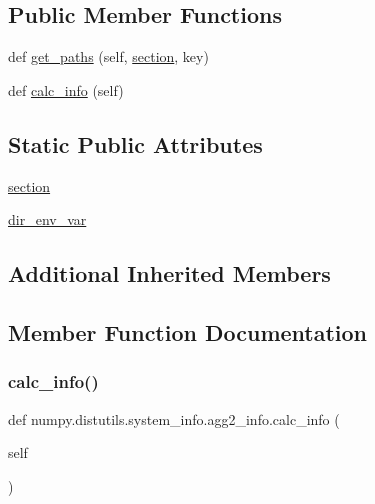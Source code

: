 \subsection*{Public Member Functions}
\begin{DoxyCompactItemize}
\item 
def \hyperlink{classnumpy_1_1distutils_1_1system__info_1_1agg2__info_aa384beee61c4af70b173aef9924310e1}{get\+\_\+paths} (self, \hyperlink{classnumpy_1_1distutils_1_1system__info_1_1agg2__info_a9e8ae6b2cc434264356af9c4a2d97e0a}{section}, key)
\item 
def \hyperlink{classnumpy_1_1distutils_1_1system__info_1_1agg2__info_aec2bec1c4276929408e5fb1f821d62ae}{calc\+\_\+info} (self)
\end{DoxyCompactItemize}
\subsection*{Static Public Attributes}
\begin{DoxyCompactItemize}
\item 
\hyperlink{classnumpy_1_1distutils_1_1system__info_1_1agg2__info_a9e8ae6b2cc434264356af9c4a2d97e0a}{section}
\item 
\hyperlink{classnumpy_1_1distutils_1_1system__info_1_1agg2__info_ab2739736e545a1f6f2c01427e8a7b90e}{dir\+\_\+env\+\_\+var}
\end{DoxyCompactItemize}
\subsection*{Additional Inherited Members}


\subsection{Member Function Documentation}
\mbox{\label{classnumpy_1_1distutils_1_1system__info_1_1agg2__info_aec2bec1c4276929408e5fb1f821d62ae}} 
\subsubsection{\texorpdfstring{calc\+\_\+info()}{calc\_info()}}
{\footnotesize\ttfamily def numpy.\+distutils.\+system\+\_\+info.\+agg2\+\_\+info.\+calc\+\_\+info (\begin{DoxyParamCaption}\item[{}]{self }\end{DoxyParamCaption})}

